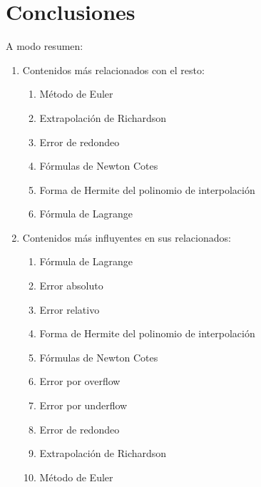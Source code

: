 \documentclass[a4paper,10pt,twocolumn]{article}
\begin{document}
        



        \newpage

\section{Conclusiones}\label{sec:conc}

  A modo resumen:
    \begin{enumerate}
        
        \item Contenidos más relacionados con el resto:
        \begin{enumerate}
            \item Método de Euler
            \item Extrapolación de Richardson
            \item Error de redondeo
            \item Fórmulas de Newton Cotes
            \item Forma de Hermite del polinomio de interpolación
            \item Fórmula de Lagrange
        \end{enumerate}
        
        \item Contenidos más influyentes en sus relacionados:
        \begin{enumerate}
            \item Fórmula de Lagrange
            \item Error absoluto
            \item Error relativo
            \item Forma de Hermite del polinomio de interpolación
            \item Fórmulas de Newton Cotes
            \item Error por overflow
            \item Error por underflow
            \item Error de redondeo
            \item Extrapolación de Richardson
            \item Método de Euler
        \end{enumerate}
        

\end{enumerate}
\end{document}
